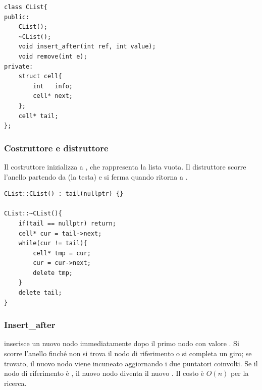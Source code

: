 \begin{codebox}
    \begin{lstlisting}
class CList{
public:
    CList();
    ~CList();
    void insert_after(int ref, int value);
    void remove(int e);
private:
    struct cell{
        int   info;
        cell* next;
    };
    cell* tail;
};
    \end{lstlisting}
\end{codebox}

\subsubsection{Costruttore e distruttore}
Il costruttore inizializza  a , che rappresenta la lista vuota. Il distruttore scorre l'anello partendo da  (la testa) e si ferma quando ritorna a .

\begin{codebox}
    \begin{lstlisting}
CList::CList() : tail(nullptr) {}

CList::~CList(){
    if(tail == nullptr) return;
    cell* cur = tail->next;
    while(cur != tail){
        cell* tmp = cur;
        cur = cur->next;
        delete tmp;
    }
    delete tail;
}
    \end{lstlisting}
\end{codebox}

\subsubsection{Insert\_after}
 inserisce un nuovo nodo immediatamente dopo il primo nodo con valore . Si scorre l'anello finché non si trova il nodo di riferimento o si completa un giro; se trovato, il nuovo nodo viene incuneato aggiornando i due puntatori coinvolti. Se il nodo di riferimento è , il nuovo nodo diventa il nuovo . Il costo è $O(n)$ per la ricerca.

